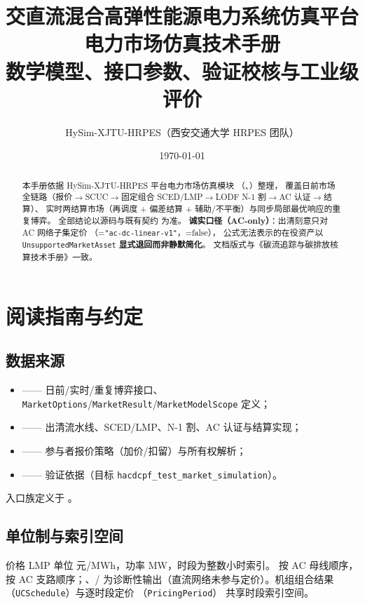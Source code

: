 \documentclass[UTF8,fontset=fandol,a4paper,11pt]{ctexart}
\title{\textbf{交直流混合高弹性能源电力系统仿真平台}\\[0.5em]
       {\Large 电力市场仿真技术手册}\\[0.3em]
       {\large 数学模型、接口参数、验证校核与工业级评价}}
\author{HySim-XJTU-HRPES（西安交通大学 HRPES 团队）}
\date{\today}
\begin{document}
\maketitle
\begin{abstract}
\noindent 本手册依据 HySim-XJTU-HRPES 平台电力市场仿真模块
（、）整理，
覆盖日前市场全链路（报价$\to$SCUC$\to$固定组合 SCED/LMP$\to$LODF N-1 割$\to$AC 认证$\to$结算）、
实时两结算市场（再调度 + 偏差结算 + 辅助/不平衡）与同步局部最优响应的重复博弈。
全部结论以源码与既有契约  为准。
\textbf{诚实口径（AC-only）}：出清刻意只对 AC 网络子集定价
（=\texttt{"ac-dc-linear-v1"}，=false），
公式无法表示的在役资产以 \texttt{UnsupportedMarketAsset} \textbf{显式退回而非静默简化}。
文档版式与《碳流追踪与碳排放核算技术手册》一致。
\end{abstract}

\tableofcontents
\newpage

\section{阅读指南与约定}
\subsection{数据来源}
\begin{itemize}
  \item {} —— 日前/实时/重复博弈接口、
        \texttt{MarketOptions}/\texttt{MarketResult}/\texttt{MarketModelScope} 定义；
  \item {} —— 出清流水线、SCED/LMP、N-1 割、AC 认证与结算实现；
  \item {} —— 参与者报价策略（加价/扣留）与所有权解析；
  \item {} —— 验证依据（目标 \texttt{hacdcpf\_test\_market\_simulation}）。
\end{itemize}
入口族定义于 。

\subsection{单位制与索引空间}
价格 LMP 单位 元/MWh，功率 MW，时段为整数小时索引。 按 AC 母线顺序，
 按 AC 支路顺序；、/
 为诊断性输出（直流网络未参与定价）。机组组合结果
（\texttt{UCSchedule}）与逐时段定价 （\texttt{PricingPeriod}）
共享时段索引空间。
\end{document}
